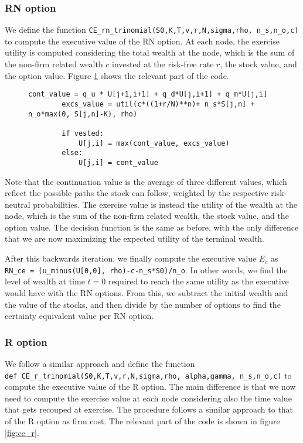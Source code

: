 \subsubsection{RN option}
We define the function \verb|CE_rn_trinomial(S0,K,T,v,r,N,sigma,rho, n_s,n_o,c)| to compute the executive value of the RN option. At each node, the exercise utility is computed considering the total wealth at the node, which is the sum of the non-firm related wealth $c$ invested at the risk-free rate $r$, the stock value, and the option value. Figure \ref*{fig:ce_rn} shows the relevant part of the code.

\begin{figure}[H]
    \begin{lstlisting}[breaklines, basicstyle=\ttfamily\small]
        cont_value = q_u * U[j+1,i+1] + q_d*U[j,i+1] + q_m*U[j,i]
        excs_value = util(c*((1+r/N)**n)+ n_s*S[j,n] + n_o*max(0, S[j,n]-K), rho)
        
        if vested:
            U[j,i] = max(cont_value, excs_value)
        else: 
            U[j,i] = cont_value
    \end{lstlisting}
 \label{fig:ce_rn}
\end{figure}

Note that the continuation value is the average of three different values, which reflect the possible paths the stock can follow, weighted by the respective risk-neutral probabilities. The exercise value is instead the utility of the wealth at the node, which is the sum of the non-firm related wealth, the stock value, and the option value. The decision function is the same as before, with the only difference that we are now maximizing the expected utility of the terminal wealth.

After this backwards iteration, we finally compute the executive value $E_c$ as \\
\verb|RN_ce = (u_minus(U[0,0], rho)-c-n_s*S0)/n_o|.
In other words, we find the level of wealth at time $t=0$ required to reach the same utility as the executive would have with the RN options. From this, we subtract the initial wealth and the value of the stocks, and then divide by the number of options to find the certainty equivalent value per RN option.

\subsubsection{R option}
We follow a similar approach and define the function\\
\verb|def CE_r_trinomial(S0,K,T,v,r,N,sigma,rho, alpha,gamma, n_s,n_o,c)| to compute the executive value of the R option. The main difference is that we now need to compute the exercise value at each node considering also the time value that gets recouped at exercise. The procedure follows a similar approach to that of the R option as firm cost. The relevant part of the code is shown in figure \ref*{fig:ce_r}.

